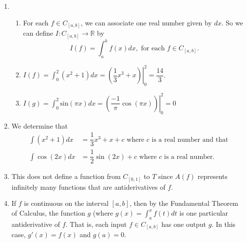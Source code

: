 \documentclass[11pt]{article}
\begin{document}
\begin{enumerate}
\item \begin{enumerate}
\item For each  $f \in C_{\left[ {a, b} \right]} $, we can associate one real number given by 
$ dx$.  So we can define  $I:C_{\left[ {a, b} \right]}  \to \mathbb{R}$
by
\[
I\left( f \right) =  \int_a^b {f\left( x \right) dx}, \text{ for each }  
f \in C_{\left[ {a, b} \right]}.
\]

\item $I \left( f \right) =\int_0^2 {\left( x^2+1 \right)}  dx = \left. {\left( {\dfrac{1}{3}x^3  + x} \right)} \right|_0^2  = \dfrac{{14}}{3}$.

\item $I\left( g \right) = \int_0^2 \text{sin} \left( \pi x \right) dx = 
\left. {\left( {\dfrac{{ - 1}}{\pi }\cos \left( {\pi x} \right)} \right)} \right|_0^2  = 0$
\end{enumerate}

\item We determine that
\begin{align*}
\int {\left( {x^2  + 1} \right) dx} &= \dfrac{1}{3}x^3  + x + c  \text{ where } c 
\text{ is a real number and that} \\
\int {\cos \left( 2x \right) dx} &= \dfrac{1}{2}\sin \left( 2x \right) + c 
\text{ where } c  \text{ is a real number}.
\end{align*}
 

\item This does not define a function from  $C_{\left[ {0, 1} \right]} $ to  $T$  since  
$A\left( f \right)$ represents infinitely many functions that are antiderivatives of  $f$.

\item If  $f$  is continuous on the interval  $\left[ {a, b} \right]$, then by the Fundamental Theorem of Calculus,  the function  $g$  (where  
$g\left( x \right) =  \int_a^x {f\left( t \right) dt}$ is one particular antiderivative of  $f$.  That is, each input  $f \in C_{\left[ {a, b} \right]} $  has one output  $g$.  In this case,  $g'\left( x \right) = f\left( x \right)$  and  $g\left( a \right) = 0$.




\end{enumerate}
\end{document}
